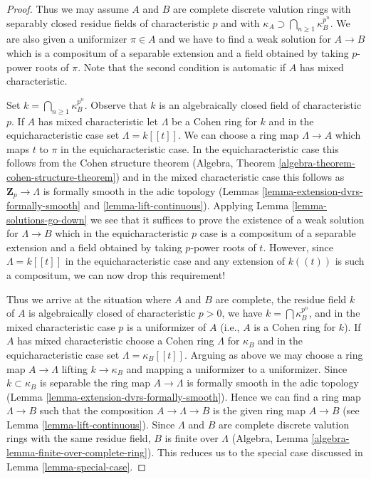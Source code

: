 \begin{proof}
\medskip\noindent
Thus we may assume $A$ and $B$ are complete discrete valution rings
with separably closed residue fields of characteristic $p$ and
with $\kappa_A \supset \bigcap\nolimits_{n \geq 1} \kappa_B^{p^n}$.
We are also given a uniformizer $\pi \in A$ and we have to find a
weak solution for $A \to B$ which is a compositum of a separable
extension and a field obtained by taking $p$-power roots of $\pi$.
Note that the second condition is automatic if $A$ has mixed characteristic.

\medskip\noindent
Set $k = \bigcap\nolimits_{n \geq 1} \kappa_B^{p^n}$.
Observe that $k$ is an algebraically closed field of characteristic $p$.
If $A$ has mixed characteristic let $\Lambda$ be a Cohen
ring for $k$ and in the equicharacteristic case set $\Lambda = k[[t]]$.
We can choose a ring map $\Lambda \to A$ which maps $t$ to $\pi$ in the
equicharacteristic case. In the equicharacteristic case this follows
from the Cohen structure theorem
(Algebra, Theorem \ref{algebra-theorem-cohen-structure-theorem}) and
in the mixed characteristic case this follows as
$\mathbf{Z}_p \to \Lambda$ is formally smooth in the adic topology
(Lemmas \ref{lemma-extension-dvrs-formally-smooth} and
\ref{lemma-lift-continuous}).
Applying Lemma \ref{lemma-solutions-go-down} we see that it suffices to prove
the existence of a weak solution for $\Lambda \to B$ which in
the equicharacteristic $p$ case is a compositum of a separable
extension and a field obtained by taking $p$-power roots of $t$.
However, since $\Lambda = k[[t]]$ in the equicharacteristic case
and any extension of $k((t))$ is such a compositum, we can now
drop this requirement!

\medskip\noindent
Thus we arrive at the situation where $A$ and $B$ are complete, the residue
field $k$ of $A$ is algebraically closed of characteristic $p > 0$,
we have $k = \bigcap \kappa_B^{p^n}$, and in the mixed characteristic
case $p$ is a uniformizer of $A$ (i.e., $A$ is a Cohen ring for $k$).
If $A$ has mixed characteristic choose a Cohen ring
$\Lambda$ for $\kappa_B$ and in the equicharacteristic case set
$\Lambda = \kappa_B[[t]]$. Arguing as above we may choose a ring map
$A \to \Lambda$ lifting $k \to \kappa_B$ and mapping a uniformizer
to a uniformizer. Since $k \subset \kappa_B$ is separable the ring
map $A \to \Lambda$ is formally smooth in the adic topology
(Lemma \ref{lemma-extension-dvrs-formally-smooth}). Hence
we can find a ring map $\Lambda \to B$ such that the composition
$A \to \Lambda \to B$ is the given ring map $A \to B$ (see
Lemma \ref{lemma-lift-continuous}).
Since $\Lambda$ and $B$ are complete discrete valution rings with the same
residue field, $B$ is finite over $\Lambda$
(Algebra, Lemma \ref{algebra-lemma-finite-over-complete-ring}).
This reduces us to the special case discussed in
Lemma \ref{lemma-special-case}.
\end{proof}

